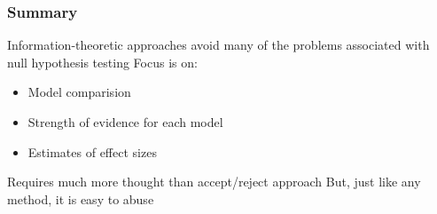 \documentclass[color=usenames,dvipsnames]{beamer}\usepackage[]{graphicx}\usepackage[]{color}
\begin{document}
\begin{frame}
  \frametitle{Summary}
  \large
    Information-theoretic approaches avoid many of the problems
      associated with null hypothesis testing
    \pause
    \vfill
    Focus is on:
      \begin{itemize}
        \large
        \item Model comparision
        \item Strength of evidence for each model
        \item Estimates of effect sizes
      \end{itemize}
    \pause
    \vfill
    Requires much more thought than accept/reject approach
    \pause
    \vfill
    But, just like any method, it is easy to abuse
\end{frame}
\end{document}
